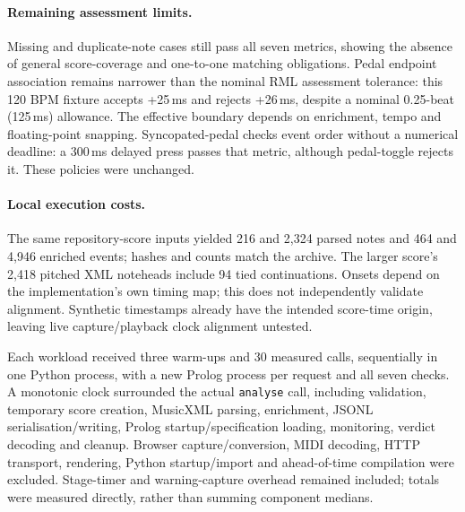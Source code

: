 \paragraph{Remaining assessment limits.}
Missing and duplicate-note cases still pass all seven metrics, showing the
absence of general score-coverage and one-to-one matching obligations.
Pedal endpoint association remains narrower than the nominal RML assessment
tolerance: this 120 BPM fixture accepts +25\,ms and rejects +26\,ms,
despite a nominal 0.25-beat (125\,ms) allowance. The effective boundary depends
on enrichment, tempo and floating-point snapping. Syncopated-pedal checks
event order without a numerical deadline: a 300\,ms delayed press passes
that metric, although pedal-toggle rejects it. These policies were unchanged.

\paragraph{Local execution costs.}
The same repository-score inputs yielded 216 and
2,324 parsed notes and 464 and
4,946 enriched events; hashes and counts match the archive.
The larger score's 2,418 pitched XML
noteheads include 94 tied continuations.
Onsets depend on the implementation's own timing map; this does not
independently validate alignment. Synthetic timestamps already have the
intended score-time origin, leaving live capture/playback clock alignment untested.

Each workload received three warm-ups and 30 measured calls, sequentially
in one Python process, with a new Prolog process per request and all seven
checks. A monotonic clock surrounded the actual \texttt{analyse} call,
including validation, temporary score creation, MusicXML parsing, enrichment,
JSONL serialisation/writing, Prolog startup/specification loading, monitoring,
verdict decoding and cleanup. Browser capture/conversion, MIDI decoding,
HTTP transport, rendering, Python startup/import and ahead-of-time compilation
were excluded. Stage-timer and warning-capture overhead remained included;
totals were measured directly, rather than summing component medians.

\begin{table}[t]
\centering
\resizebox{\linewidth}{!}{}
\caption{New local analysis times in seconds. Quartiles use linear
interpolation; all measured samples are retained and warm-ups excluded.}
\label{tab:local-cost}
\end{table}

